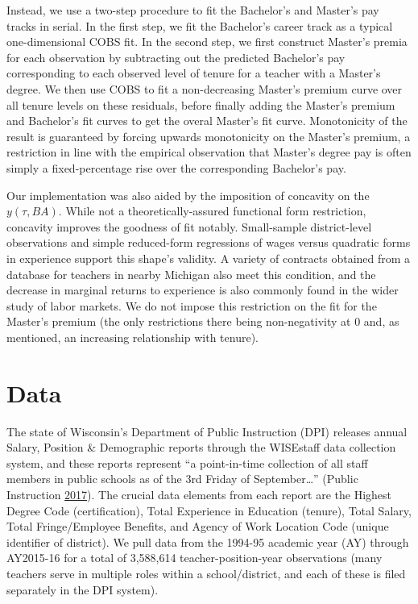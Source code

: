 \documentclass[]{article}
\begin{document}
Instead, we use a two-step procedure to fit the Bachelor's and Master's
pay tracks in serial. In the first step, we fit the Bachelor's career
track as a typical one-dimensional COBS fit. In the second step, we
first construct Master's premia for each observation by subtracting out
the predicted Bachelor's pay corresponding to each observed level of
tenure for a teacher with a Master's degree. We then use COBS to fit a
non-decreasing Master's premium curve over all tenure levels on these
residuals, before finally adding the Master's premium and Bachelor's fit
curves to get the overal Master's fit curve. Monotonicity of the result
is guaranteed by forcing upwards monotonicity on the Master's premium, a
restriction in line with the empirical observation that Master's degree
pay is often simply a fixed-percentage rise over the corresponding
Bachelor's pay.

Our implementation was also aided by the imposition of concavity on the
\(y(\tau, BA)\). While not a theoretically-assured functional form
restriction, concavity improves the goodness of fit notably.
Small-sample district-level observations and simple reduced-form
regressions of wages versus quadratic forms in experience support this
shape's validity. A variety of contracts obtained from a database for
teachers in nearby Michigan also meet this condition, and the decrease
in marginal returns to experience is also commonly found in the wider
study of labor markets. We do not impose this restriction on the fit for
the Master's premium (the only restrictions there being non-negativity
at 0 and, as mentioned, an increasing relationship with tenure).

\section{Data}\label{data}

The state of Wisconsin's Department of Public Instruction (DPI) releases
annual Salary, Position \& Demographic reports through the WISEstaff
data collection system, and these reports represent ``a point-in-time
collection of all staff members in public schools as of the 3rd Friday
of September\ldots{}'' (Public Instruction
\protect\hyperlink{ref-dpi}{2017}). The crucial data elements from each
report are the Highest Degree Code (certification), Total Experience in
Education (tenure), Total Salary, Total Fringe/Employee Benefits, and
Agency of Work Location Code (unique identifier of district). We pull
data from the 1994-95 academic year (AY) through AY2015-16 for a total
of 3,588,614 teacher-position-year observations (many teachers serve in
multiple roles within a school/district, and each of these is filed
separately in the DPI system).
\end{document}
